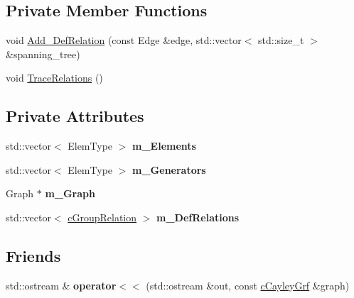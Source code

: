 \subsection*{Private Member Functions}
\begin{DoxyCompactItemize}
\item 
void \hyperlink{classcCayleyGrf_a1d6153e03d163ea10242b4088091c705}{Add\-\_\-\-Def\-Relation} (const Edge \&edge, std\-::vector$<$ std\-::size\-\_\-t $>$ \&spanning\-\_\-tree)
\item 
void \hyperlink{classcCayleyGrf_a2598371d6a962b027539109023bc65b5}{Trace\-Relations} ()
\end{DoxyCompactItemize}
\subsection*{Private Attributes}
\begin{DoxyCompactItemize}
\item 
\hypertarget{classcCayleyGrf_af4c3fa359332e9097ad511da6df21e01}{std\-::vector$<$ Elem\-Type $>$ {\bfseries m\-\_\-\-Elements}}\label{classcCayleyGrf_af4c3fa359332e9097ad511da6df21e01}

\item 
\hypertarget{classcCayleyGrf_aa0263f38d2605e8b1c43830af0dd7d9b}{std\-::vector$<$ Elem\-Type $>$ {\bfseries m\-\_\-\-Generators}}\label{classcCayleyGrf_aa0263f38d2605e8b1c43830af0dd7d9b}

\item 
\hypertarget{classcCayleyGrf_a8ac7f5226ca5868bfb9bbfbd10021981}{Graph $\ast$ {\bfseries m\-\_\-\-Graph}}\label{classcCayleyGrf_a8ac7f5226ca5868bfb9bbfbd10021981}

\item 
\hypertarget{classcCayleyGrf_a3d283f6c83baff00377c6784743b2e27}{std\-::vector$<$ \hyperlink{classcGroupRelation}{c\-Group\-Relation} $>$ {\bfseries m\-\_\-\-Def\-Relations}}\label{classcCayleyGrf_a3d283f6c83baff00377c6784743b2e27}

\end{DoxyCompactItemize}
\subsection*{Friends}
\begin{DoxyCompactItemize}
\item 
\hypertarget{classcCayleyGrf_a335728ff704ed565af614d4eadbc4609}{std\-::ostream \& {\bfseries operator$<$$<$} (std\-::ostream \&out, const \hyperlink{classcCayleyGrf}{c\-Cayley\-Grf} \&graph)}\label{classcCayleyGrf_a335728ff704ed565af614d4eadbc4609}

\end{DoxyCompactItemize}



